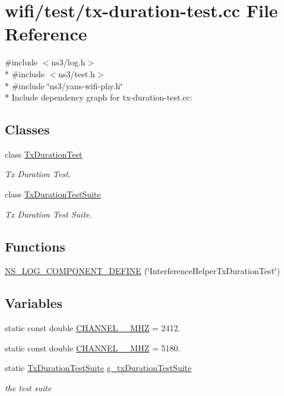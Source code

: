 \hypertarget{tx-duration-test_8cc}{}\section{wifi/test/tx-\/duration-\/test.cc File Reference}
\label{tx-duration-test_8cc}
{\ttfamily \#include $<$ns3/log.\+h$>$}\\*
{\ttfamily \#include $<$ns3/test.\+h$>$}\\*
{\ttfamily \#include \char`\"{}ns3/yans-\/wifi-\/phy.\+h\char`\"{}}\\*
Include dependency graph for tx-\/duration-\/test.cc\+:
\subsection*{Classes}
\begin{DoxyCompactItemize}
\item 
class \hyperlink{classTxDurationTest}{Tx\+Duration\+Test}
\begin{DoxyCompactList}\small\item\em Tx Duration Test. \end{DoxyCompactList}\item 
class \hyperlink{classTxDurationTestSuite}{Tx\+Duration\+Test\+Suite}
\begin{DoxyCompactList}\small\item\em Tx Duration Test Suite. \end{DoxyCompactList}\end{DoxyCompactItemize}
\subsection*{Functions}
\begin{DoxyCompactItemize}
\item 
\hyperlink{tx-duration-test_8cc_aca30aa51177d1fb747550cad5906e746}{N\+S\+\_\+\+L\+O\+G\+\_\+\+C\+O\+M\+P\+O\+N\+E\+N\+T\+\_\+\+D\+E\+F\+I\+NE} (\char`\"{}Interference\+Helper\+Tx\+Duration\+Test\char`\"{})
\end{DoxyCompactItemize}
\subsection*{Variables}
\begin{DoxyCompactItemize}
\item 
static const double \hyperlink{tx-duration-test_8cc_a236e95d73454722c31846ac6fcd3e497}{C\+H\+A\+N\+N\+E\+L\+\_\+\_\+\+M\+HZ} = 2412.
\item 
static const double \hyperlink{tx-duration-test_8cc_aa5502728ec4925b10c0869c47ad8c769}{C\+H\+A\+N\+N\+E\+L\+\_\+\_\+\+M\+HZ} = 5180.
\item 
static \hyperlink{classTxDurationTestSuite}{Tx\+Duration\+Test\+Suite} \hyperlink{tx-duration-test_8cc_a253c03b8bbe95f14021bf48743f384f0}{g\+\_\+tx\+Duration\+Test\+Suite}
\begin{DoxyCompactList}\small\item\em the test suite \end{DoxyCompactList}\end{DoxyCompactItemize}


